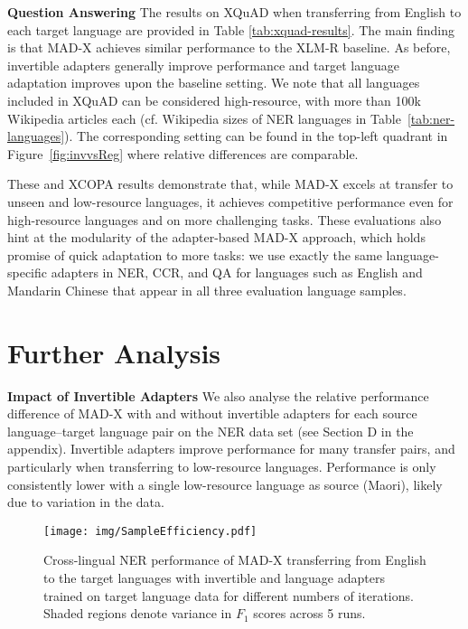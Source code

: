 \documentclass[11pt,a4paper]{article}
\newcommand{\model}[1]{\textsc{MAD-X}}
\newcommand{\xlmr}[1]{\textsc{XLM-R}}
\begin{document}
\vspace{1.8mm}
\noindent \textbf{Question Answering}\hspace{0.3mm} \label{ss:qa}
The results on XQuAD when transferring from English to each target language are provided in Table \ref{tab:xquad-results}. The main finding is that \model{} achieves similar performance to the \xlmr{} baseline. As before, invertible adapters generally improve performance and target language adaptation improves upon the baseline setting. We note that all languages included in XQuAD can be considered high-resource, with more than 100k Wikipedia articles each (cf. Wikipedia sizes of NER languages in Table~\ref{tab:ner-languages}). The corresponding setting can be found in the top-left quadrant in Figure~\ref{fig:invvsReg} where relative differences are comparable.

These and XCOPA results demonstrate that, while \model{} excels at transfer to unseen and low-resource languages, it achieves competitive performance even for high-resource languages and on more challenging tasks. These evaluations also hint at the modularity of the adapter-based \model{} approach, which holds promise of quick adaptation to more tasks: we use exactly the same language-specific adapters in NER, CCR, and QA for languages such as English and Mandarin Chinese that appear in all three evaluation language samples.


\section{Further Analysis}

\noindent \textbf{Impact of Invertible Adapters}\hspace{0.3mm} 
We also analyse the relative performance difference of \model{} with and without invertible adapters for each source language--target language pair on the NER data set (see Section D in the appendix). 
Invertible adapters improve performance for many transfer pairs, and particularly when transferring to low-resource languages. Performance is only consistently lower with a single low-resource language as source (Maori), likely due to variation in the data. 



 \begin{figure} \centering
\texttt{[image: img/SampleEfficiency.pdf]}
\caption{Cross-lingual NER performance of \model{} transferring from English to the target languages with invertible and language adapters trained on target language data for different numbers of iterations. Shaded regions denote variance in $F_1$ scores across 5 runs.}
\label{fig:sample_eff}
\end{figure}
\end{document}
